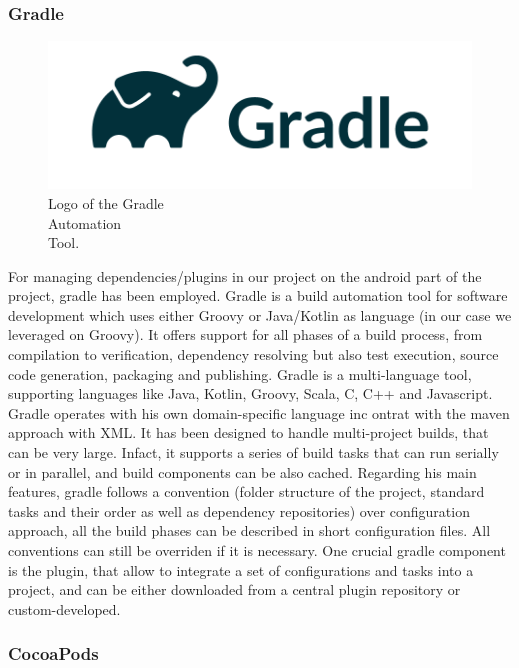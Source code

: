 \subsubsection{Gradle}
\label{subsubsec:gradle}

\begin{figure} %
    \centering
    \includegraphics[width=\linewidth]{images/gradle.png}
    \caption{Logo of the Gradle\\Automation\\Tool.}
\end{figure}

For managing dependencies/plugins in our project on the android part of the project, gradle has been employed. Gradle is a build automation tool for software development which uses either Groovy or Java/Kotlin as language (in our case we leveraged on Groovy). It offers support for all phases of a build process, from compilation to verification, dependency resolving but also test execution, source code generation, packaging and publishing. Gradle is a multi-language tool, supporting languages like Java, Kotlin, Groovy, Scala, C, C++ and Javascript. Gradle operates with his own domain-specific language inc ontrat with the maven approach with XML. It has been designed to handle multi-project builds, that can be very large. Infact, it supports a series of build tasks that can run serially or in parallel, and build components can be also cached. Regarding his main features, gradle follows a convention (folder structure of the project, standard tasks and their order as well as dependency repositories) over configuration approach, all the build phases can be described in short configuration files. All conventions can still be overriden if it is necessary. One crucial gradle component is the plugin, that allow to integrate a set of configurations and tasks into a project, and can be either downloaded from a central plugin repository or custom-developed\cite{Gradle}.

\subsubsection{CocoaPods}
\label{subsubsec:cocoapods}

